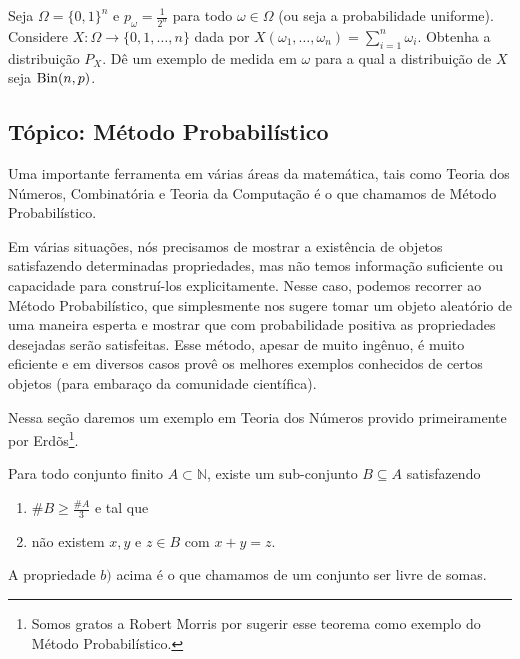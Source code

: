 \begin{exercise}
  Seja $\Omega = \{0,1\}^n$ e $p_\omega = \tfrac 1{2^n}$ para todo $\omega \in \Omega$ (ou seja a probabilidade uniforme).
  Considere $X: \Omega \to \{0,1, \dots, n\}$ dada por $X(\omega_1, \dots, \omega_n) = \sum_{i=1}^n \omega_i$.
  Obtenha a distribuição $P_X$.
  Dê um exemplo de medida em $\omega$ para a qual a distribuição de $X$ seja $\operatorname{Bin}(n,p)$.
\end{exercise}

\begin{topics}

\section{Tópico: Método Probabilístico}

Uma importante ferramenta em várias áreas da matemática, tais como Teoria dos Números, Combinatória e Teoria da Computação é o que chamamos de Método Probabilístico. 

Em várias situações, nós precisamos de mostrar a existência de objetos satisfazendo determinadas propriedades, mas não temos informação suficiente ou capacidade para construí-los explicitamente.
Nesse caso, podemos recorrer ao Método Probabilístico, que simplesmente nos sugere tomar um objeto aleatório de uma maneira esperta e mostrar que com probabilidade positiva as propriedades desejadas serão satisfeitas.
Esse método, apesar de muito ingênuo, é muito eficiente e em diversos casos provê os melhores exemplos conhecidos de certos objetos (para embaraço da comunidade científica).

Nessa seção daremos um exemplo em Teoria dos Números provido primeiramente por Erdõs\footnote{Somos gratos a Robert Morris por sugerir esse teorema como exemplo do Método Probabilístico.}.

\begin{theorem}[Erdös]
  Para todo conjunto finito $A \subset \mathbb{N}$, existe um sub-conjunto $B \subseteq A$ satisfazendo
  \begin{enumerate}[\quad a)]
  \item $\# B \geq \frac{\#A}{3}$ e tal que
  \item não existem $x, y$ e $z \in B$ com $x + y = z$.
  \end{enumerate}
  A propriedade $b)$ acima é o que chamamos de um conjunto ser livre de somas. 
\end{theorem}


\end{topics}

